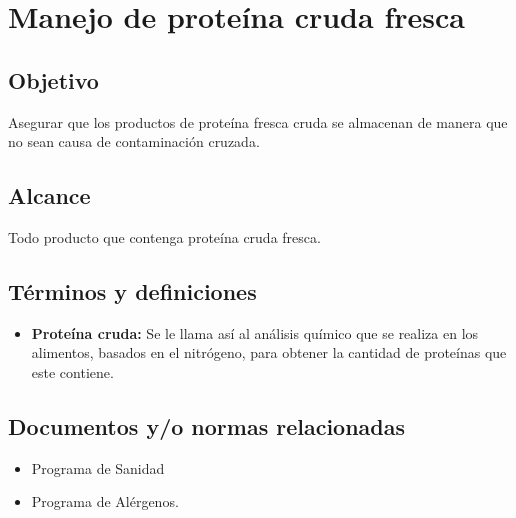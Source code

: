 \thispagestyle{formato-PI}
\renewcommand{\MayorVer}{2}
\renewcommand{\MenorVer}{1}
\renewcommand{\Codigo}{PSA-1-PROG} %
\renewcommand{\FechaPub}{2023--01}
\renewcommand{\Titulo}{Manejo de proteína cruda fresca}

\section{\Titulo}
\label{PRO-ManejoDeProtFresca}



\subsection{Objetivo}

Asegurar que los productos de proteína fresca cruda se almacenan de manera que no sean causa de contaminación cruzada.

\subsection{Alcance}

Todo producto que contenga proteína cruda fresca.

\subsection{Términos y definiciones}

\begin{itemize}
	\item \textbf{Proteína cruda:} Se le llama así al análisis químico que se realiza en los alimentos, basados en el nitrógeno, para obtener la cantidad de proteínas que este contiene.
\end{itemize}

\subsection{Documentos y/o normas relacionadas}

\begin{itemize}
	\item Programa de Sanidad
	\item Programa de Alérgenos.
\end{itemize}

